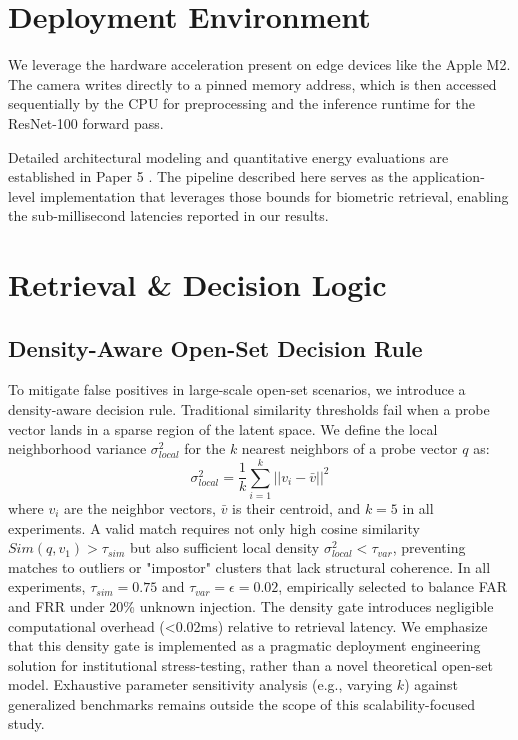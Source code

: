 \documentclass[conference]{IEEEtran}
\begin{document}
\section{Deployment Environment}

We leverage the hardware acceleration present on edge devices like the Apple M2. The camera writes directly to a pinned memory address, which is then accessed sequentially by the CPU for preprocessing and the inference runtime for the ResNet-100 forward pass. 

Detailed architectural modeling and quantitative energy evaluations are established in Paper 5 \cite{b16}. The pipeline described here serves as the application-level implementation that leverages those bounds for biometric retrieval, enabling the sub-millisecond latencies reported in our results.

\section{Retrieval \& Decision Logic}

\subsection{Density-Aware Open-Set Decision Rule}

To mitigate false positives in large-scale open-set scenarios, we introduce a density-aware decision rule. Traditional similarity thresholds fail when a probe vector lands in a sparse region of the latent space. We define the local neighborhood variance $\sigma^2_{local}$ for the $k$ nearest neighbors of a probe vector $q$ as:
\begin{equation}
\sigma^2_{local} = \frac{1}{k} \sum_{i=1}^{k} ||v_i - \bar{v}||^2
\end{equation}
where $v_i$ are the neighbor vectors, $\bar{v}$ is their centroid, and $k=5$ in all experiments. A valid match requires not only high cosine similarity $Sim(q, v_{1}) > \tau_{sim}$ but also sufficient local density $\sigma^2_{local} < \tau_{var}$, preventing matches to outliers or "impostor" clusters that lack structural coherence. In all experiments, $\tau_{sim}=0.75$ and $\tau_{var}=\epsilon=0.02$, empirically selected to balance FAR and FRR under 20\% unknown injection. The density gate introduces negligible computational overhead (<0.02ms) relative to retrieval latency. We emphasize that this density gate is implemented as a pragmatic deployment engineering solution for institutional stress-testing, rather than a novel theoretical open-set model. Exhaustive parameter sensitivity analysis (e.g., varying $k$) against generalized benchmarks remains outside the scope of this scalability-focused study.
\end{document}
